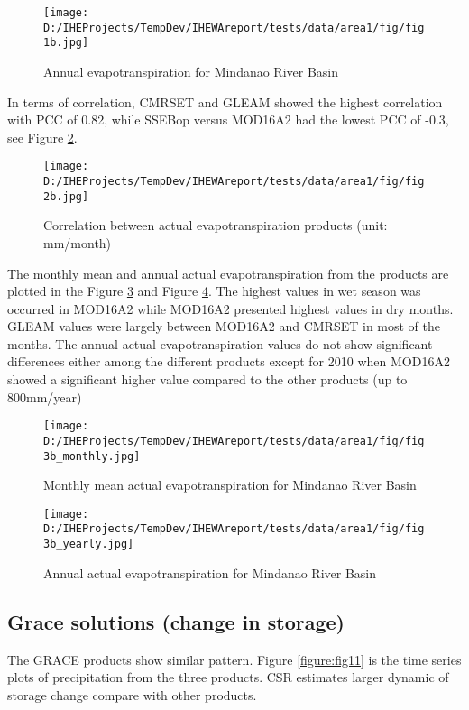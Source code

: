 \documentclass{article}%
\begin{document}
\begin{figure}[H]%
\centering%
\texttt{[image: D:/IHEProjects/TempDev/IHEWAreport/tests/data/area1/fig/fig1b.jpg]}%
\caption{Annual evapotranspiration  for Mindanao River Basin}%
\label{figure:fig7}%
\end{figure}

%
In terms of correlation, CMRSET and GLEAM showed the highest correlation with PCC of 0.82, while  SSEBop versus  MOD16A2 had the lowest PCC of  -0.3, see Figure \ref{figure:fig8}.%
\linebreak%


\begin{figure}[H]%
\centering%
\texttt{[image: D:/IHEProjects/TempDev/IHEWAreport/tests/data/area1/fig/fig2b.jpg]}%
\caption{Correlation between actual evapotranspiration products (unit: mm/month)}%
\label{figure:fig8}%
\end{figure}

%
The monthly mean and annual actual evapotranspiration from the products are plotted in the Figure \ref{figure:fig9} and Figure \ref{figure:fig10}. The highest values in wet season was occurred in MOD16A2 while MOD16A2 presented highest values in dry months. GLEAM values were largely between MOD16A2 and CMRSET in most of the months.%
\linebreak%
The annual actual evapotranspiration values do not show significant differences either among the different products except for 2010 when MOD16A2 showed a significant higher value compared to the other products (up to 800mm/year)%
\linebreak%


\begin{figure}[H]%
\centering%
\texttt{[image: D:/IHEProjects/TempDev/IHEWAreport/tests/data/area1/fig/fig3b\_monthly.jpg]}%
\caption{Monthly mean actual evapotranspiration for Mindanao River Basin}%
\label{figure:fig9}%
\end{figure}

%


\begin{figure}[H]%
\centering%
\texttt{[image: D:/IHEProjects/TempDev/IHEWAreport/tests/data/area1/fig/fig3b\_yearly.jpg]}%
\caption{Annual actual evapotranspiration for Mindanao River Basin}%
\label{figure:fig10}%
\end{figure}

%
\subsection{Grace solutions (change in storage)}%
\label{subsec:Gracesolutions(changeinstorage)}%
The GRACE products show similar pattern. Figure \ref{figure:fig11} is the time series plots of precipitation from the three products. CSR estimates larger dynamic of storage change compare with other products.%
\linebreak%
\end{document}
